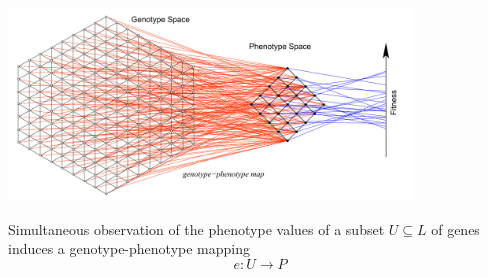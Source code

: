 \begin{frame}
\begin{center}
\includegraphics[width=0.8\textwidth]{fig/gpmap.png}\\
\hfill \cite{Stadler2002}
\end{center}
Simultaneous observation of the phenotype values of a subset $U \subseteq L$ of genes induces a genotype-phenotype mapping
$$
e \colon U \longrightarrow P
$$
\end{frame}
